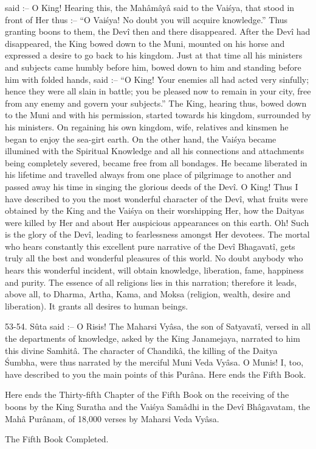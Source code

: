 said :-- O King! Hearing this, the Mah\^am\^ay\^a said to the Vai\'sya, that stood in front of Her thus :-- ``O Vai\'sya! No doubt you will acquire knowledge.'' Thus granting boons to them, the Dev\^i then and there disappeared. After the Dev\^i had disappeared, the King bowed down to the Muni, mounted on his horse and expressed a desire to go back to his kingdom. Just at that time all his ministers and subjects came humbly before him, bowed down to him and standing before him with folded hands, said :-- ``O King! Your enemies all had acted very sinfully; hence they were all slain in battle; you be pleased now to remain in your city, free from any enemy and govern your subjects.'' The King, hearing thus, bowed down to the Muni and with his permission, started towards his kingdom, surrounded by his ministers. On regaining his own kingdom, wife, relatives and kinsmen he began to enjoy the sea-girt earth. On the other hand, the Vai\'sya became illumined with the Spiritual Knowledge and all his connections and attachments being completely severed, became free from all bondages. He became liberated in his lifetime and travelled always from one place of pilgrimage to another and passed away his time in singing the glorious deeds of the Dev\^i. O King! Thus I have described to you the most wonderful character of the Dev\^i, what fruits were obtained by the King and the Vai\'sya on their worshipping Her, how the Daityas were killed by Her and about Her auspicious appearances on this earth. Oh! Such is the glory of the Dev\^i, leading to fearlessness amongst Her devotees. The mortal who hears constantly this excellent pure narrative of the Dev\^i Bhagavat\^i, gets truly all the best and wonderful pleasures of this world. No doubt anybody who hears this wonderful incident, will obtain knowledge, liberation, fame, happiness and purity. The essence of all religions lies in this narration; therefore it leads, above all, to Dharma, Artha, Kama, and Moksa (religion, wealth, desire and liberation). It grants all desires to human beings.

53-54. S\^uta said :-- O Risis! The Maharsi Vy\^asa, the son of Satyavat\^i, versed in all the departments of knowledge, asked by the King Janamejaya, narrated to him this divine Samhit\^a. The character of Chandik\^a, the killing of the Daitya \'Sumbha, were thus narrated by the merciful Muni Veda Vy\^asa. O Munis! I, too, have described to you the main points of this Pur\^ana. Here ends the Fifth Book.

Here ends the Thirty-fifth Chapter of the Fifth Book on the receiving of the boons by the King Suratha and the Vai\'sya Sam\^adhi in the Dev\^i Bh\^agavatam, the Mah\^a Pur\^anam, of 18,000 verses by Maharsi Veda Vy\^asa.

The Fifth Book Completed.